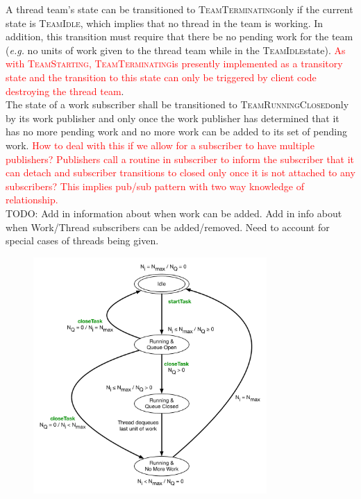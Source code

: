 \documentclass{article}
\newcommand{\TeamStarting}      {\textsc{TeamStarting}}
\newcommand{\TeamIdle}          {\textsc{TeamIdle}}
\newcommand{\TeamRunningClosed} {\textsc{TeamRunningClosed}}
\newcommand{\TeamTerminating}   {\textsc{TeamTerminating}}
\begin{document}
A thread team's state can be transitioned to \TeamTerminating only if the
current state is \TeamIdle, which implies that no thread in the team is working.
In addition, this transition must require that there be no pending work for the
team (\textit{e.g.} no units of work given to the thread team while in the
\TeamIdle state).  \textcolor{red}{As with \TeamStarting, \TeamTerminating is
presently implemented as a transitory state and the transition to this state can
only be triggered by client code destroying the thread team}.\\

The state of a work subscriber shall be transitioned to \TeamRunningClosed only
by its work publisher and only once the work publisher has determined that it
has no more pending work and no more work can be added to its set of pending
work.  \textcolor{red}{How to deal with this if we allow for a subscriber to
have multiple publishers?  Publishers call a routine in subscriber to inform the
subscriber that it can detach and subscriber transitions to closed only once it
is not attached to any subscribers?  This implies pub/sub pattern with two way
knowledge of relationship.}\\

TODO: Add in information about when work can be added.  Add in info about when
Work/Thread subscribers can be added/removed.  Need to account for special cases
of threads being given.\\

\begin{figure}[!ht]
\begin{center}
\includegraphics[width=3.5in]{TeamStates.pdf}
\caption[]{}
\label{fig:TeamStateDiagram}
\end{center}
\end{figure}
\end{document}
